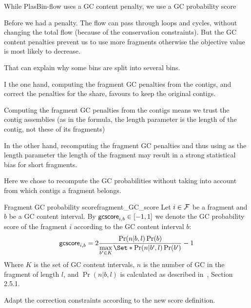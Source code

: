 \begin{newfeatbox}
  While PlasBin-flow uses a GC content penalty, we use a GC probability score

  \begin{questionbox}
    Before we had a penalty.
    The flow can pass through loops and cycles, without changing the total flow (because of the conservation constraints). But the GC content penalties prevent us to use more fragments otherwise the objective value is most likely to decrease.

    That can explain why some bins are split into several bins.
  \end{questionbox}

  \begin{questionbox}
    I the one hand, computing the fragment GC penalties from the contigs, and correct the penalties for the share, favours to keep the original contigs.

    Computing the fragment GC penalties from the contigs means we trust the contig assemblies (as in the formula, the length parameter is the length of the contig, not these of its fragments)

    In the other hand, recomputing the fragment GC penalties and thus using as the length parameter the length of the fragment may result in a strong statistical bias for short fragments.

    \begin{notebox}
      Here we chose to recompute the GC probabilities without taking into account from which contigs a fragment belongs.
    \end{notebox}
  \end{questionbox}
\end{newfeatbox}

\begin{definition}{Fragment GC probability score}{fragment_GC_score}
  Let \(i \in \mathcal{F}{}\) be a fragment and \(b\) be a GC content interval.
  By \(\mathsf{gcscore}_{i, b} \in [-1, 1]\) we denote the GC probability score of the fragment \(i\) according to the GC content interval \(b\):
  \[
    \gcscore{i}{b} = 2 \frac{\Pr(n|b,l)\Pr(b)}{\max\limits_{b' \in K}\Set*{\Pr(n|b',l)\Pr(b')}} - 1
  \]
  Where \(K\) is the set of GC content intervals, \(n\) is the number of GC in the fragment of length \(l\), and \(\Pr(n|b,l)\) is calculated as described in~\cite{manePlasBinflowFlowbasedMILP2023}, Section 2.5.1.

  \begin{fixmebox}
    Adapt the correction constraints according to the new score definition.
  \end{fixmebox}
\end{definition}

